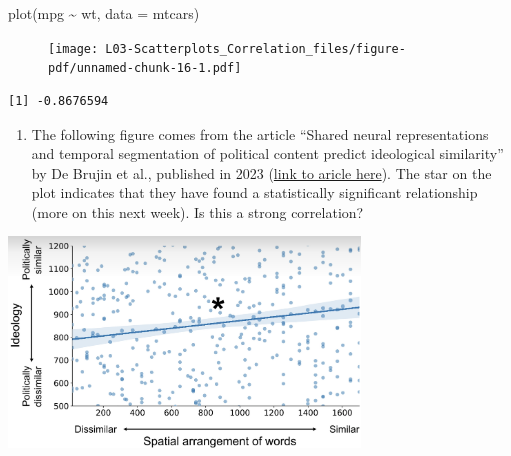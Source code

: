 \documentclass[
  letterpaper,
  DIV=11,
  numbers=noendperiod]{scrreprt}
\newenvironment{Shaded}{\begin{snugshade}}{\end{snugshade}}
\newcommand{\AttributeTok}[1]{\textcolor[rgb]{0.40,0.45,0.13}{#1}}
\newcommand{\FunctionTok}[1]{\textcolor[rgb]{0.28,0.35,0.67}{#1}}
\newcommand{\NormalTok}[1]{\textcolor[rgb]{0.00,0.23,0.31}{#1}}
\newcommand{\SpecialCharTok}[1]{\textcolor[rgb]{0.37,0.37,0.37}{#1}}
\providecommand{\tightlist}{%
  \setlength{\itemsep}{0pt}\setlength{\parskip}{0pt}}\usepackage{longtable,booktabs,array}
\begin{document}
\begin{Shaded}
\begin{Highlighting}[]
\FunctionTok{plot}\NormalTok{(mpg }\SpecialCharTok{\textasciitilde{}}\NormalTok{ wt, }\AttributeTok{data =}\NormalTok{ mtcars)}
\end{Highlighting}
\end{Shaded}

\begin{figure}[H]

{\centering \texttt{[image: L03-Scatterplots\_Correlation\_files/figure-pdf/unnamed-chunk-16-1.pdf]}

}

\end{figure}

\begin{Shaded}
\end{Shaded}

\begin{verbatim}
[1] -0.8676594
\end{verbatim}

\begin{enumerate}
\def\labelenumi{\arabic{enumi}.}
\setcounter{enumi}{1}
\tightlist
\item
  The following figure comes from the article ``Shared neural
  representations and temporal segmentation of political content predict
  ideological similarity'' by De Brujin et al., published in 2023
  (\href{https://www.science.org/doi/10.1126/sciadv.abq5920}{link to
  aricle here}). The star on the plot indicates that they have found a
  statistically significant relationship (more on this next week). Is
  this a strong correlation?
\end{enumerate}

\includegraphics[width=0.7\textwidth]{figs/scatterbad.png}
\end{document}
